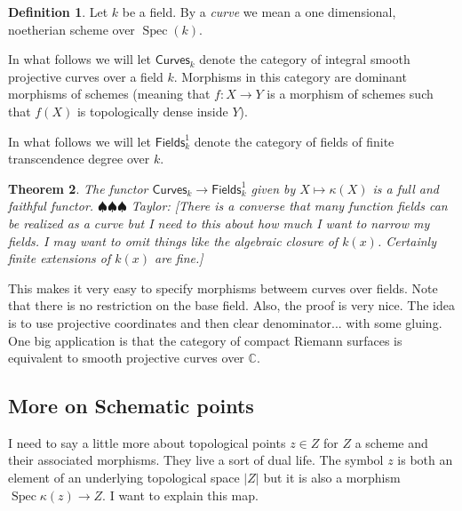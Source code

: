 \documentclass[12pt]{article}
\numberwithin{equation}{section}
\newtheorem{theorem}{Theorem}[subsection]
\theoremstyle{definition}
\newtheorem{definition}[theorem]{Definition}
\theoremstyle{remark}
\newcommand{\CC}{\mathbb{C}}
\newcommand{\Spec}{\operatorname{Spec}}
\newcommand{\Fields}{\mathsf{Fields}}
\newcommand{\Curves}{\mathsf{Curves}}
\newcommand{\taylor}[1]{{\color{blue} \sf $\spadesuit\spadesuit\spadesuit$ Taylor: [#1]}}
\begin{document}
\begin{definition}
	Let $k$ be a field. 
	By a \emph{curve} we mean a one dimensional, noetherian scheme over $\Spec(k)$.
\end{definition}

In what follows we will let $\Curves_k$ denote the category of integral smooth projective curves over a field $k$.
Morphisms in this category are dominant morphisms of schemes (meaning that $f:X\to Y$ is a morphism of schemes such that $f(X)$ is topologically dense inside $Y$).

In what follows we will let $\Fields_k^1$ denote the category of fields of finite transcendence degree over $k$. 
\begin{theorem}
	The functor $\Curves_k \to \Fields_k^1$ given by $X \mapsto \kappa(X)$ is a full and faithful functor. 
	\taylor{There is a converse that many function fields can be realized as a curve but I need to this about how much I want to narrow my fields. I may want to omit things like the algebraic closure of $k(x)$. Certainly finite extensions of $k(x)$ are fine.}
\end{theorem}
This makes it very easy to specify morphisms betweem curves over fields. 
Note that there is no restriction on the base field.
Also, the proof is very nice. 
The idea is to use projective coordinates and then clear denominator... with some gluing. 
One big application is that the category of compact Riemann surfaces is equivalent to smooth projective curves over $\CC$. 

\subsection{More on Schematic points}
I need to say a little more about topological points $z\in Z$ for $Z$ a scheme and their associated morphisms. 
They live a sort of dual life. 
The symbol $z$ is both an element of an underlying topological space $\vert Z \vert$ but it is also a morphism $\Spec \kappa(z) \to Z$. 
I want to explain this map.
\end{document}

